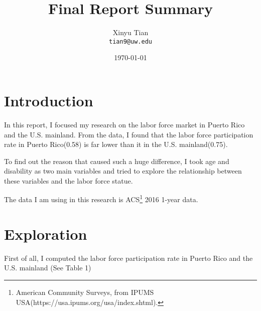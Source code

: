 \documentclass[11pt]{article}
\title{Final Report Summary}
\author{
        Xinyu Tian\\
        \texttt{tian9@uw.edu}
}
\date{\today}
\begin{document}


\maketitle

\section{Introduction}\label{intro}
In this report, I focused my research on the labor force market in Puerto Rico and the U.S. mainland. From the data, I found that the labor force participation rate in Puerto Rico(0.58) is far lower than it in the U.S. mainland(0.75).

To find out the reason that caused such a huge difference, I took age and disability as two main variables and tried to explore the relationship between these variables and the labor force statue.

The data I am using in this research is ACS\footnote{American Community Surveys, from IPUMS USA(https://usa.ipums.org/usa/index.shtml).} 2016 1-year data. 


\section{Exploration}\label{eda}


First of all, I computed the labor force participation rate in Puerto Rico and the U.S. mainland (See Table 1) 
\end{document}
